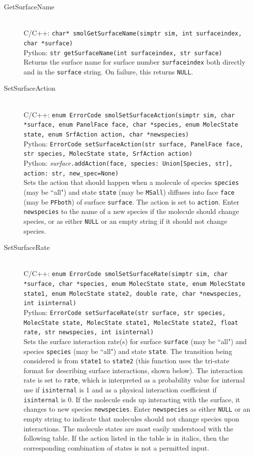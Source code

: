 \documentclass {book}
\newcommand {\ttt} {\texttt}
\begin{document}
\begin{description}
\item[GetSurfaceName]
\hfill \\
C/C++: \ttt{char* smolGetSurfaceName(simptr sim, int surfaceindex, char *surface)}\\
Python: \ttt{str getSurfaceName(int surfaceindex, str surface)}\\
Returns the surface name for surface number \ttt{surfaceindex} both directly and in the \ttt{surface} string. On failure, this returns \ttt{NULL}.

\item[SetSurfaceAction]
\hfill \\
C/C++: \ttt{enum ErrorCode smolSetSurfaceAction(simptr sim, char *surface, enum PanelFace face, char *species, enum MolecState state, enum SrfAction action, char *newspecies)}\\
Python: \ttt{ErrorCode setSurfaceAction(str surface, PanelFace face, str species, MolecState state, SrfAction action)}\\
Python: \textit{surface}\ttt{.addAction(face, species: Union[Species, str], action: str, new\_spec=None)}\\
Sets the action that should happen when a molecule of species \ttt{species} (may be ``all") and state \ttt{state} (may be \ttt{MSall}) diffuses into face \ttt{face} (may be \ttt{PFboth}) of surface \ttt{surface}. The action is set to \ttt{action}. Enter \ttt{newspecies} to the name of a new species if the molecule should change species, or as either \ttt{NULL} or an empty string if it should not change species.

\item[SetSurfaceRate]
\hfill \\
C/C++: \ttt{enum ErrorCode smolSetSurfaceRate(simptr sim, char *surface, char *species, enum MolecState state, enum MolecState state1, enum MolecState state2, double rate, char *newspecies, int isinternal)}\\
Python: \ttt{ErrorCode setSurfaceRate(str surface, str species, MolecState state, MolecState state1, MolecState state2, float rate, str newspecies, int isinternal)}\\
Sets the surface interaction rate(s) for surface \ttt{surface} (may be ``all") and species \ttt{species} (may be ``all") and state \ttt{state}. The transition being considered is from \ttt{state1} to \ttt{state2} (this function uses the tri-state format for describing surface interactions, shown below). The interaction rate is set to \ttt{rate}, which is interpreted as a probability value for internal use if \ttt{isinternal} is 1 and as a physical interaction coefficient if \ttt{isinternal} is 0. If the molecule ends up interacting with the surface, it changes to new species \ttt{newspecies}. Enter \ttt{newspecies} as either \ttt{NULL} or an empty string to indicate that molecules should not change species upon interactions. The molecule states are most easily understood with the following table. If the action listed in the table is in italics, then the corresponding combination of states is not a permitted input.


\end{description}
\end{document}
